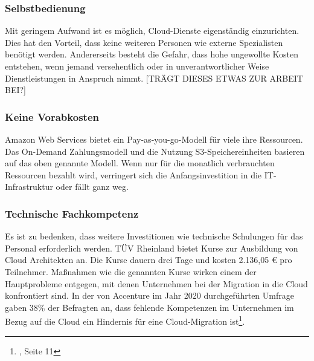 \subsubsection{Selbstbedienung}
Mit geringem Aufwand ist es möglich, Cloud-Dienste eigenständig einzurichten. Dies hat den Vorteil, dass keine weiteren Personen wie externe Spezialisten benötigt werden.
Andererseits besteht die Gefahr, dass hohe ungewollte Kosten entstehen, wenn jemand versehentlich oder in unverantwortlicher Weise Dienstleistungen in Anspruch nimmt.
 [TRÄGT DIESES ETWAS ZUR ARBEIT BEI?]     

\subsubsection{Keine Vorabkosten}
Amazon Web Services bietet ein Pay-as-you-go-Modell für viele ihre Ressourcen. Das On-Demand Zahlungsmodell und die Nutzung S3-Speichereinheiten basieren auf das oben genannte Modell.
Wenn nur für die monatlich verbrauchten Ressourcen bezahlt wird, verringert sich die Anfangsinvestition in die IT-Infrastruktur oder fällt ganz weg. 

\subsubsection{Technische Fachkompetenz}
Es ist zu bedenken, dass weitere Investitionen wie technische Schulungen für das Personal erforderlich werden. TÜV Rheinland bietet Kurse zur Ausbildung von Cloud Architekten an. Die Kurse dauern drei Tage und kosten 2.136,05 € pro Teilnehmer. Maßnahmen wie die genannten Kurse wirken einem der Hauptprobleme entgegen, mit denen Unternehmen bei der Migration in die Cloud konfrontiert sind. In der von Accenture im Jahr 2020 durchgeführten Umfrage gaben 38\% der Befragten an, dass fehlende Kompetenzen im Unternehmen im Bezug auf die Cloud ein Hindernis für eine Cloud-Migration ist\footnote{\cite{ACC1}, Seite 11}.

